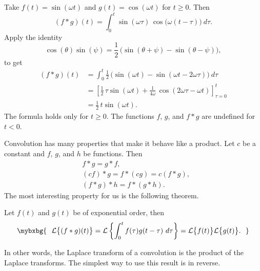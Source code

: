 \begin{example} \label{ltc:convsincosex}
Take $f(t) = \sin (\omega t)$ and $g(t) = \cos (\omega t)$ for $t \geq 0$.
Then 
\begin{equation*}
(f*g)(t)
=
\int_0^t  \sin ( \omega \tau ) \,
\cos \bigl( \omega (t-\tau) \bigr) ~ d\tau .
\end{equation*}
Apply the identity
\begin{equation*}
\cos (\theta) \sin (\psi) =
\frac{1}{2} \, \bigl( \sin (\theta + \psi) - \sin (\theta - \psi) \bigr) ,
\end{equation*}
to get
\begin{equation*}
\begin{split}
(f*g)(t)
& =
\int_0^t
\frac{1}{2} \, \bigl( \sin (\omega t) - \sin (\omega t - 2 \omega \tau
) \bigr) ~ d\tau
\\
& =
\left[ \frac{1}{2} \, \tau  \sin (\omega t) + \frac{1}{4\omega} \, \cos (2 \omega \tau -
\omega t) \right]_{\tau=0}^t
\\
& = \frac{1}{2} \, t \sin (\omega t) .
\end{split}
\end{equation*}
The formula holds only for $t \geq 0$.  The functions $f$, $g$,
and $f*g$ are undefined for $t < 0$.
\end{example}

Convolution has many properties that make it behave like a product.
Let $c$ be a constant and $f$, $g$, and $h$ be functions.  Then
\begin{align*}
& f * g = g * f , \\
& (c f) * g = f * (c g) = c (f*g) , \\
& ( f * g ) * h = f * ( g * h ) .
\end{align*}
The most interesting property for us is the following theorem.

\begin{theorem}
Let $f(t)$ and $g(t)$ be of exponential order, then
\begin{equation*}
\mybxbg{~~
\mathcal{L} \bigl\{ (f*g)(t) \bigr\}
=
\mathcal{L} \left\{ \int_0^t f(\tau) g(t-\tau) ~ d\tau \right\}
=
\mathcal{L} \bigl\{ f(t) \bigr\} \mathcal{L} \bigl\{ g(t) \bigr\} .
~~}
\end{equation*}
\end{theorem}

In other words, the Laplace transform of a convolution is the product
of the Laplace transforms.  The simplest way to use this result is in
reverse.

